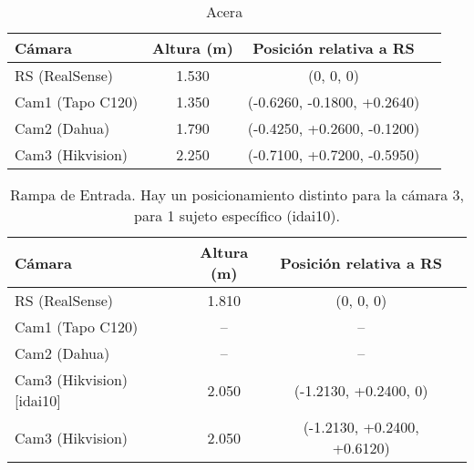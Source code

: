 \begin{table}[H]
\centering
\scriptsize
\begin{tabular}{lccc}
\hline
\textbf{Cámara} & \textbf{Altura (m)} & \textbf{Posición relativa a RS} \\
\hline
RS (RealSense) & 1.530 & (0, 0, 0) \\
Cam1 (Tapo C120) & 1.350 & (-0.6260, -0.1800, +0.2640) \\
Cam2 (Dahua) & 1.790 & (-0.4250, +0.2600, -0.1200) \\
Cam3 (Hikvision) & 2.250 & (-0.7100, +0.7200, -0.5950) \\
\hline
\end{tabular}
\caption{Acera}\label{tab:Sidewalk}
\end{table}

\begin{table}[H]
\centering
\scriptsize
\begin{tabular}{lccc}
\hline
\textbf{Cámara} & \textbf{Altura (m)} & \textbf{Posición relativa a RS} \\
\hline
RS (RealSense) & 1.810 & (0, 0, 0) \\
Cam1 (Tapo C120) & -- & -- \\
Cam2 (Dahua) & -- & -- \\
Cam3 (Hikvision) [idai10] & 2.050 & (-1.2130, +0.2400, 0) \\
Cam3 (Hikvision) & 2.050 & (-1.2130, +0.2400, +0.6120) \\
\hline
\end{tabular}
\caption{Rampa de Entrada. Hay un posicionamiento distinto para la cámara 3, para 1 sujeto específico (idai10).}\label{tab:EntranceRamp}
\end{table}
